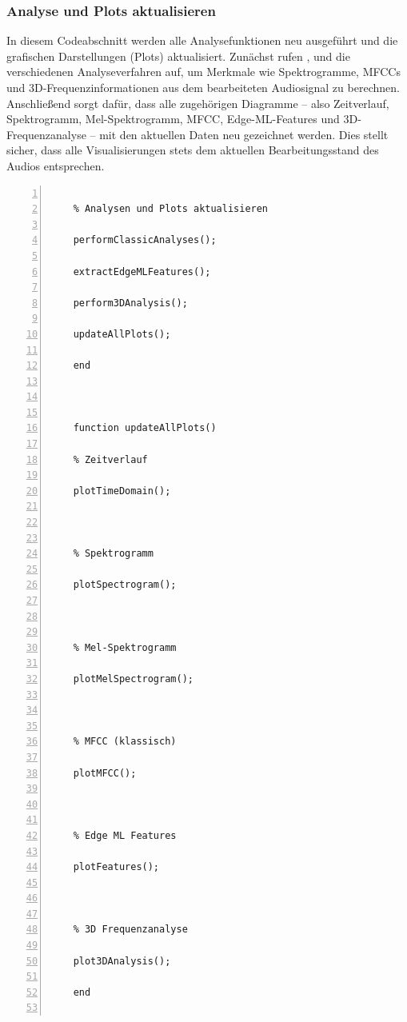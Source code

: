 \subsubsection{Analyse und Plots aktualisieren}

In diesem Codeabschnitt werden alle Analysefunktionen neu ausgeführt und die grafischen Darstellungen (Plots) aktualisiert. Zunächst rufen ,  und  die verschiedenen Analyseverfahren auf, um Merkmale wie Spektrogramme, MFCCs und 3D-Frequenzinformationen aus dem bearbeiteten Audiosignal zu berechnen. Anschließend sorgt  dafür, dass alle zugehörigen Diagramme – also Zeitverlauf, Spektrogramm, Mel-Spektrogramm, MFCC, Edge-ML-Features und 3D-Frequenzanalyse – mit den aktuellen Daten neu gezeichnet werden. Dies stellt sicher, dass alle Visualisierungen stets dem aktuellen Bearbeitungsstand des Audios entsprechen. \cite{Hossain:2025} \cite{MathWorks:2025Plots}

\begin{lstlisting}[frame=single, numbers=left, style=Matlab-Pyglike]
    
    % Analysen und Plots aktualisieren 
    
    performClassicAnalyses(); 
    
    extractEdgeMLFeatures(); 
    
    perform3DAnalysis(); 
    
    updateAllPlots(); 
    
    end 
    
    
    
    function updateAllPlots() 
    
    % Zeitverlauf 
    
    plotTimeDomain(); 
    
    
    
    % Spektrogramm 
    
    plotSpectrogram(); 
    
    
    
    % Mel-Spektrogramm 
    
    plotMelSpectrogram(); 
    
    
    
    % MFCC (klassisch) 
    
    plotMFCC(); 
    
    
    
    % Edge ML Features 
    
    plotFeatures(); 
    
    
    
    % 3D Frequenzanalyse 
    
    plot3DAnalysis(); 
    
    end 
    
\end{lstlisting}

